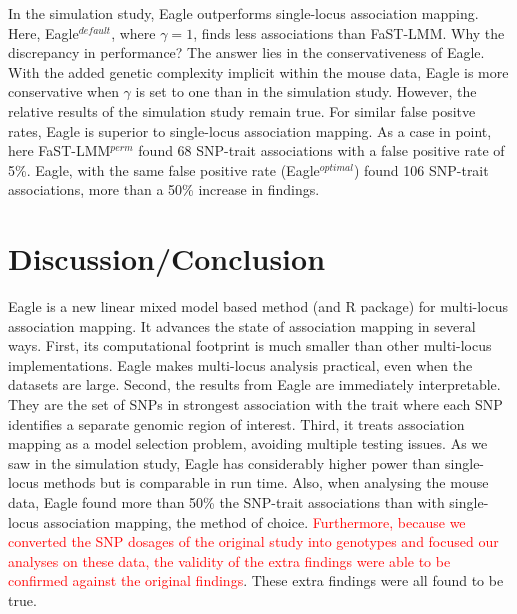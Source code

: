 \documentclass{bioinfo}
\begin{document}
In the simulation study, Eagle outperforms single-locus association mapping. Here, Eagle$^{default}$, where $\gamma=1$, finds less associations 
than FaST-LMM. Why the discrepancy in performance?   The answer lies in the conservativeness of Eagle.  With the added genetic complexity implicit within the mouse data, Eagle is more conservative when $\gamma$ is set to one than in the simulation study.  However, the relative results of the simulation study remain true. For similar false positve rates, Eagle is superior to single-locus association mapping. As a case in point, here FaST-LMM$^{perm}$ found 68 SNP-trait associations with a false positive rate of 5\%. Eagle, with the same false positive rate (Eagle$^{optimal}$) found 106 SNP-trait associations, more 
than a 50\% increase in findings. 






 
\section{Discussion/Conclusion}
Eagle is a new linear mixed model based method (and R package) for multi-locus association mapping. It advances the state of association mapping in several ways. 
First, its computational footprint is much smaller than other multi-locus implementations. Eagle makes multi-locus analysis 
practical, even when the datasets are large. Second, the results from
 Eagle are immediately interpretable. They are the set of SNPs in strongest association with the trait where 
each SNP identifies a separate genomic region of interest. Third, it treats association mapping as a model selection problem, avoiding 
 multiple testing issues. 
 As we saw in the simulation study, Eagle has considerably higher power than single-locus methods but is comparable in run time.
Also, when analysing the mouse data, Eagle found more than 50\% the SNP-trait associations than 
with single-locus association mapping, the method of choice. \textcolor{red}{Furthermore, because we converted the SNP dosages of the 
original study into genotypes and focused our analyses on these data, the validity of the extra findings were able to  be confirmed 
against the original findings}. These extra findings were all found to be true. 
\end{document}
